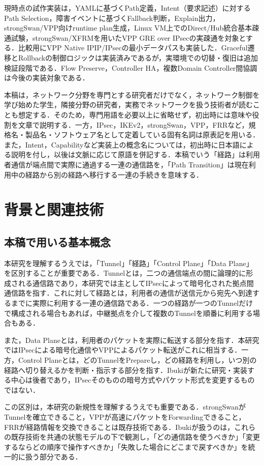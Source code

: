 \documentclass[11pt,a4paper,twoside]{ltjsarticle}
\begin{document}
現時点の試作実装は，YAMLに基づくPath定義，Intent（要求記述）に対するPath Selection，障害イベントに基づくFallback判断，Explain出力，strongSwan/VPP向けruntime plan生成，Linux VM上でのDirect/Hub統合基本疎通試験，strongSwan/XFRMを用いたVPP GRE over IPsecの実疎通を対象とする．比較用にVPP Native IPIP/IPsecの最小データパスも実装した．Graceful遷移とRollbackの制御ロジックは実装済みであるが，実環境での切替・復旧は追加検証段階である．Flow Preserve，Controller HA，複数Domain Controller間協調は今後の実装対象である．

本稿は，ネットワーク分野を専門とする研究者だけでなく，ネットワーク制御を学び始めた学生，隣接分野の研究者，実務でネットワークを扱う技術者が読むことも想定する．そのため，専門用語を必要以上に省略せず，初出時には意味や役割を文章で説明する．一方，IPsec，IKEv2，strongSwan，VPP，FRRなど，規格名・製品名・ソフトウェア名として定着している固有名詞は原表記を用いる．また，Intent，Capabilityなど実装上の概念名については，初出時に日本語による説明を付し，以後は文脈に応じて原語を併記する．本稿でいう「経路」は利用者通信が端点間で実際に通過する一連の通信路を，「Path Transition」は現在利用中の経路から別の経路へ移行する一連の手続きを意味する．


\section{背景と関連技術}

\subsection{本稿で用いる基本概念}
本研究を理解するうえでは，「Tunnel」「経路」「Control Plane」「Data Plane」を区別することが重要である．Tunnelとは，二つの通信端点の間に論理的に形成される通信路であり，本研究では主としてIPsecによって暗号化された拠点間通信路を指す．これに対して経路とは，利用者の通信が送信元から宛先へ到達するまでに実際に利用する一連の通信路である．一つの経路が一つのTunnelだけで構成される場合もあれば，中継拠点を介して複数のTunnelを順番に利用する場合もある．

また，Data Planeとは，利用者のパケットを実際に転送する部分を指す．本研究ではIPsecによる暗号化通信やVPPによるパケット転送がこれに相当する．一方，Control Planeとは，どのTunnelをPrepareし，どの経路を利用し，いつ別の経路へ切り替えるかを判断・指示する部分を指す．Ibukiが新たに研究・実装する中心は後者であり，IPsecそのものの暗号方式やパケット形式を変更するものではない．

この区別は，本研究の新規性を理解するうえでも重要である．strongSwanがTunnelを確立できること，VPPが高速にパケットをForwardingできること，FRRが経路情報を交換できることは既存技術である．Ibukiが扱うのは，これらの既存技術を共通の状態モデルの下で観測し，「どの通信路を使うべきか」「変更するならどの順序で操作すべきか」「失敗した場合にどこまで戻すべきか」を統一的に扱う部分である．
\end{document}

